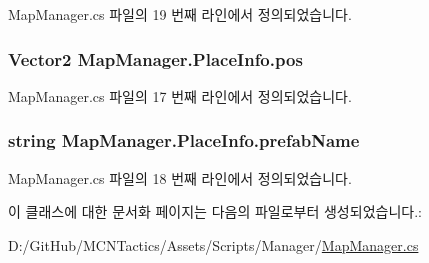 Map\+Manager.\+cs 파일의 19 번째 라인에서 정의되었습니다.

\subsubsection[{\texorpdfstring{pos}{pos}}]{\setlength{\rightskip}{0pt plus 5cm}Vector2 Map\+Manager.\+Place\+Info.\+pos}\hypertarget{class_map_manager_1_1_place_info_a892976a463c8f25b15b248220f10289e}{}\label{class_map_manager_1_1_place_info_a892976a463c8f25b15b248220f10289e}


Map\+Manager.\+cs 파일의 17 번째 라인에서 정의되었습니다.

\subsubsection[{\texorpdfstring{prefab\+Name}{prefabName}}]{\setlength{\rightskip}{0pt plus 5cm}string Map\+Manager.\+Place\+Info.\+prefab\+Name}\hypertarget{class_map_manager_1_1_place_info_a82ac5b1455ed7b78f7338784ac91fe1b}{}\label{class_map_manager_1_1_place_info_a82ac5b1455ed7b78f7338784ac91fe1b}


Map\+Manager.\+cs 파일의 18 번째 라인에서 정의되었습니다.



이 클래스에 대한 문서화 페이지는 다음의 파일로부터 생성되었습니다.\+:\begin{DoxyCompactItemize}
\item 
D\+:/\+Git\+Hub/\+M\+C\+N\+Tactics/\+Assets/\+Scripts/\+Manager/\hyperlink{_map_manager_8cs}{Map\+Manager.\+cs}\end{DoxyCompactItemize}
